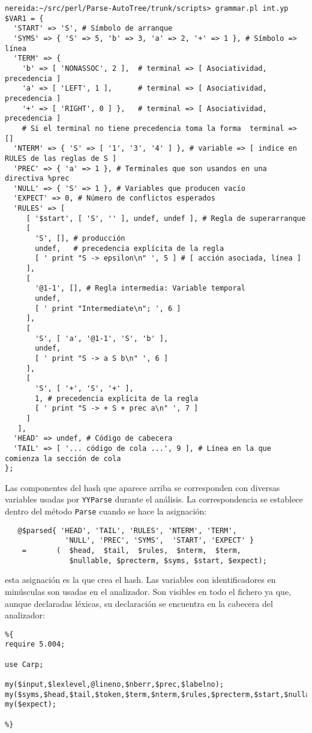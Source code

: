 \begin{verbatim}
nereida:~/src/perl/Parse-AutoTree/trunk/scripts> grammar.pl int.yp
$VAR1 = {
  'START' => 'S', # Símbolo de arranque
  'SYMS' => { 'S' => 5, 'b' => 3, 'a' => 2, '+' => 1 }, # Símbolo => línea
  'TERM' => { 
    'b' => [ 'NONASSOC', 2 ],  # terminal => [ Asociatividad, precedencia ]
    'a' => [ 'LEFT', 1 ],      # terminal => [ Asociatividad, precedencia ]
    '+' => [ 'RIGHT', 0 ] },   # terminal => [ Asociatividad, precedencia ]
    # Si el terminal no tiene precedencia toma la forma  terminal => []
  'NTERM' => { 'S' => [ '1', '3', '4' ] }, # variable => [ indice en RULES de las reglas de S ]
  'PREC' => { 'a' => 1 }, # Terminales que son usandos en una directiva %prec
  'NULL' => { 'S' => 1 }, # Variables que producen vacío
  'EXPECT' => 0, # Número de conflictos esperados
  'RULES' => [
     [ '$start', [ 'S', '' ], undef, undef ], # Regla de superarranque
     [
       'S', [], # producción
       undef,   # precedencia explícita de la regla
       [ ' print "S -> epsilon\n" ', 5 ] # [ acción asociada, línea ]
     ],
     [
       '@1-1', [], # Regla intermedia: Variable temporal
       undef,
       [ ' print "Intermediate\n"; ', 6 ]
     ],
     [
       'S', [ 'a', '@1-1', 'S', 'b' ],
       undef,
       [ ' print "S -> a S b\n" ', 6 ]
     ],
     [
       'S', [ '+', 'S', '+' ],
       1, # precedencia explícita de la regla
       [ ' print "S -> + S + prec a\n" ', 7 ]
     ]
   ],
  'HEAD' => undef, # Código de cabecera 
  'TAIL' => [ '... código de cola ...', 9 ], # Línea en la que comienza la sección de cola
};
\end{verbatim}

Las componentes del hash que aparece
arriba se corresponden
con diversas variables usadas por \verb|YYParse| durante el análisis. La correspondencia
se establece dentro  del método \verb|Parse| cuando se hace la asignación:

\begin{verbatim}
   @$parsed{ 'HEAD', 'TAIL', 'RULES', 'NTERM', 'TERM',
              'NULL', 'PREC', 'SYMS',  'START', 'EXPECT' }
    =       (  $head,  $tail,  $rules,  $nterm,  $term,
               $nullable, $precterm, $syms, $start, $expect);
\end{verbatim}
esta asignación es la que crea el hash.
Las variables con identificadores en minúsculas son usadas 
en el analizador. Son visibles en todo el fichero ya que,
aunque declaradas léxicas, su declaración se encuentra 
en la cabecera del analizador:
\begin{verbatim}
%{
require 5.004;

use Carp;

my($input,$lexlevel,@lineno,$nberr,$prec,$labelno);
my($syms,$head,$tail,$token,$term,$nterm,$rules,$precterm,$start,$nullable);
my($expect);

%}
\end{verbatim}

